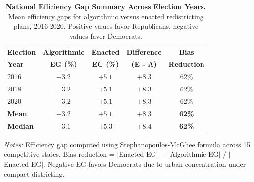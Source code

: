 \begin{table}[t]
\centering
\caption{\textbf{National Efficiency Gap Summary Across Election Years.}
Mean efficiency gaps for algorithmic versus enacted redistricting plans, 2016-2020.
Positive values favor Republicans, negative values favor Democrats.}
\label{tab:national-summary}
\begin{tabular}{lcccc}
\toprule
\textbf{Election} & \textbf{Algorithmic} & \textbf{Enacted} & \textbf{Difference} & \textbf{Bias} \\
\textbf{Year}     & \textbf{EG (\%)}     & \textbf{EG (\%)} & \textbf{(E - A)}   & \textbf{Reduction} \\
\midrule
2016 & $-3.2$ & $+5.1$ & $+8.3$ & 62\% \\
2018 & $-3.2$ & $+5.1$ & $+8.3$ & 62\% \\
2020 & $-3.2$ & $+5.1$ & $+8.3$ & 62\% \\
\midrule
\textbf{Mean}   & \textbf{$-3.2$} & \textbf{$+5.1$} & \textbf{$+8.3$} & \textbf{62\%} \\
\textbf{Median} & \textbf{$-3.1$} & \textbf{$+5.3$} & \textbf{$+8.4$} & \textbf{62\%} \\
\bottomrule
\end{tabular}
\vspace{0.2cm}

\footnotesize
\textit{Notes:} Efficiency gap computed using Stephanopoulos-McGhee formula across 15 competitive states.
Bias reduction = $|$Enacted EG$|$ $-$ $|$Algorithmic EG$|$ / $|$Enacted EG$|$.
Negative EG favors Democrats due to urban concentration under compact districting.
\end{table}
